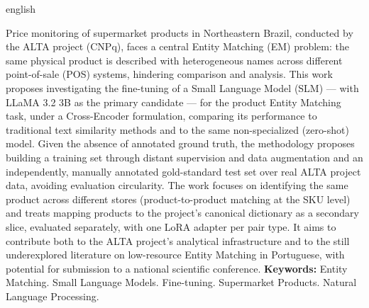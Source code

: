 \documentclass[
    article,
    12pt,
    oneside,
    a4paper,
    english,
    brazilian
    ]{abntex2}
\numberwithin{equation}{section}
\begin{document}
\begin{otherlanguage*}{english}
\begin{resumo}[Abstract]
\noindent Price monitoring of supermarket products in Northeastern Brazil, conducted by the ALTA project (CNPq), faces a central Entity Matching (EM) problem: the same physical product is described with heterogeneous names across different point-of-sale (POS) systems, hindering comparison and analysis. This work proposes investigating the fine-tuning of a Small Language Model (SLM) --- with LLaMA 3.2 3B as the primary candidate --- for the product Entity Matching task, under a Cross-Encoder formulation, comparing its performance to traditional text similarity methods and to the same non-specialized (zero-shot) model. Given the absence of annotated ground truth, the methodology proposes building a training set through distant supervision and data augmentation and an independently, manually annotated gold-standard test set over real ALTA project data, avoiding evaluation circularity. The work focuses on identifying the same product across different stores (product-to-product matching at the SKU level) and treats mapping products to the project's canonical dictionary as a secondary slice, evaluated separately, with one LoRA adapter per pair type. It aims to contribute both to the ALTA project's analytical infrastructure and to the still underexplored literature on low-resource Entity Matching in Portuguese, with potential for submission to a national scientific conference.
\newline
\noindent \textbf{Keywords:} Entity Matching. Small Language Models. Fine-tuning. Supermarket Products. Natural Language Processing.
\end{resumo}
\end{otherlanguage*}
\newpage

\begin{siglas}
\end{siglas}
\end{document}
